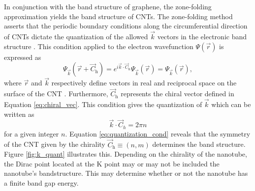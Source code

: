 In conjunction with the band structure of graphene, the zone-folding approximation yields the band structure of CNTs. The zone-folding method asserts that the periodic boundary conditions along the circumferential direction of CNTs dictate the quantization of the allowed $\vec{k}$ vectors in the electronic band structure \cite{charlier2007electronic}. This condition applied to the electron wavefunction $\Psi(\vec{r})$ is expressed as
\begin{equation}
\Psi_{\vec{k}}(\vec{r} + \vec{C}_\text{h}) = e^{i \vec{k} \cdot \vec{C}_\text{h}} \Psi_{\vec{k}}(\vec{r}) = \Psi_{\vec{k}}(\vec{r}),
\label{eq:boundary_cond}
\end{equation}
where $\vec{r}$ and $\vec{k}$ respectively define vectors in real and reciprocal space on the surface of the CNT \cite{charlier2007electronic}. Furthermore, $\vec{C}_\text{h}$ represents the chiral vector defined in Equation \eqref{eq:chiral_vec}. This condition gives the quantization of $\vec{k}$ which can be written as
\begin{equation}
	\vec{k} \cdot \vec{C}_h = 2\pi n
	\label{eq:quantization_cond}
\end{equation}
for a given integer $n$. Equation \eqref{eq:quantization_cond} reveals that the symmetry of the CNT given by the chirality $\vec{C}_\text{h} \equiv (n,m)$ determines the band structure. Figure \ref{fig:k_quant} illustrates this. Depending on the chirality of the nanotube, the Dirac point located at the K point may or may not be included the nanotube's bandstructure. This may determine whether or not the nanotube has a finite band gap energy.

